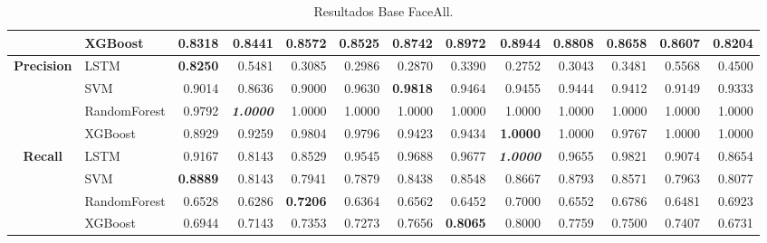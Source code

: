 \begin{table}[H]
\begin{adjustbox}{max width=14cm}
\begin{tabular}{|c|l|r|r|r|r|r|r|r|r|r|r|r|}
			& XGBoost &  0.8318 &  0.8441 &  0.8572 &  0.8525 &  0.8742 &  \textbf{0.8972} &  0.8944 &  0.8808 &  0.8658 &  0.8607 &  0.8204 \\
			\hline
			\textbf{Precision} & LSTM &  \textbf{0.8250} &  0.5481 &  0.3085 &  0.2986 &  0.2870 &  0.3390 &  0.2752 &  0.3043 &  0.3481 &  0.5568 &  0.4500 \\
			& SVM &  0.9014 &  0.8636 &  0.9000 &  0.9630 &  \textbf{0.9818} &  0.9464 &  0.9455 &  0.9444 &  0.9412 &  0.9149 &  0.9333 \\
			& RandomForest &  0.9792 &  \textit{\textbf{1.0000}} &  1.0000 &  1.0000 &  1.0000 &  1.0000 &  1.0000 &  1.0000 &  1.0000 &  1.0000 &  1.0000 \\
			& XGBoost &  0.8929 &  0.9259 &  0.9804 &  0.9796 &  0.9423 &  0.9434 &  \textbf{1.0000} &  1.0000 &  0.9767 &  1.0000 &  1.0000 \\
			\hline
			\textbf{Recall} & LSTM &  0.9167 &  0.8143 &  0.8529 &  0.9545 &  0.9688 &  0.9677 &  \textit{\textbf{1.0000}} &  0.9655 &  0.9821 &  0.9074 &  0.8654 \\
			& SVM &  \textbf{0.8889} &  0.8143 &  0.7941 &  0.7879 &  0.8438 &  0.8548 &  0.8667 &  0.8793 &  0.8571 &  0.7963 &  0.8077 \\
			& RandomForest &  0.6528 &  0.6286 &  \textbf{0.7206} &  0.6364 &  0.6562 &  0.6452 &  0.7000 &  0.6552 &  0.6786 &  0.6481 &  0.6923 \\
			& XGBoost &  0.6944 &  0.7143 &  0.7353 &  0.7273 &  0.7656 &  \textbf{0.8065} &  0.8000 &  0.7759 &  0.7500 &  0.7407 &  0.6731 \\
			\hline
		\end{tabular}
	\end{adjustbox}
	\caption{Resultados Base FaceAll.}
	\label{tab:faceAllBase}
\end{table}

